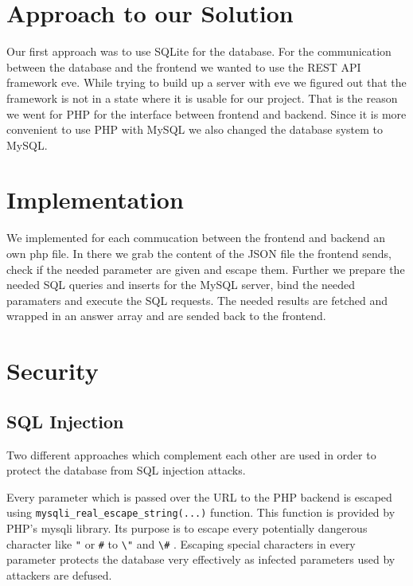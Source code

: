 

\section{Approach to our Solution}
Our first approach was to use SQLite for the database. For the communication between the database and the frontend we wanted to use the REST API framework eve\cite{python-eve}. While trying to build up a server with eve we figured out that the framework is not in a state where it is usable for our project. That is the reason we went for PHP for the interface between frontend and backend. Since it is more convenient to use PHP with MySQL we also changed the database system to MySQL.

\section{Implementation}
We implemented for each commucation between the frontend and backend an own php file. In there we grab the content of the JSON file the frontend sends, check if the needed parameter are given and escape them. Further we prepare the needed SQL queries and inserts for the MySQL server, bind the needed paramaters and execute the SQL requests. The needed results are fetched and wrapped in an answer array and are sended back to the frontend.

\section{Security}
\subsection{SQL Injection}
Two different approaches which complement each other are used in order to protect the database from SQL injection attacks. 

Every parameter which is passed over the URL to the PHP backend is escaped using \texttt{mysqli\_real\_escape\_string(...)} function. This function is provided by PHP's mysqli library. Its purpose is to escape every potentially dangerous character like \texttt{"} or \texttt{\#} to \texttt{\textbackslash"} and \texttt{\textbackslash\#} . Escaping special characters in every parameter protects the database very effectively as infected parameters used by attackers are defused.

